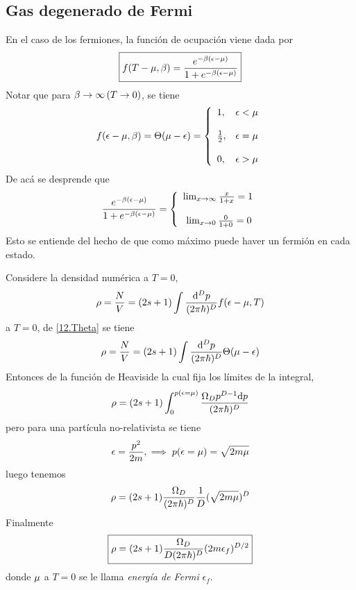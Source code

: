 \subsection{Gas degenerado de Fermi}
En el caso de los fermiones, la función de ocupación viene dada por
\begin{equation}
  \boxed{f(T-\mu,\beta )=\frac{e^{-\beta(\epsilon-\mu  )}}{1+e^{-\beta(\epsilon-\mu)}}}
\end{equation}
Notar que para $\beta\to \infty \,(T\to 0)$, se tiene
\begin{equation}\label{12.Theta}
  f(\epsilon-\mu ,\beta )=\Theta (\mu-\epsilon )= \left\{ \begin{array}{lcc} 1,& \epsilon<\mu \\ \\ 
  \frac{1}{2},&\epsilon=\mu \\ \\  0,&\epsilon>\mu  \end{array}\right.
\end{equation}
De acá se desprende que
\begin{equation}
  \frac{e^{-\beta(\epsilon-\mu  )}}{1+e^{-\beta(\epsilon-\mu)}}= \left\{\begin{array}{lcc}
  	\lim_{x\to\infty}\frac{x}{1+x}=1\\ \\\
  	\lim_{x\to 0}\frac{0}{1+0}=0
  \end{array}   \right.
\end{equation}
Esto se entiende del hecho de que como máximo puede haver un fermión en cada estado.

Considere la densidad numérica a $T=0$,
\begin{equation}
  \rho=\frac{N}{V}=(2s+1)\int \frac{\dd^Dp}{(2\pi \hbar)^D}f(\epsilon-\mu ,T)
\end{equation}
a $T=0$, de \eqref{12.Theta} se tiene
\begin{equation}
  \rho=\frac{N}{V}=(2s+1)\int \frac{\dd^Dp}{(2\pi \hbar)^D} \Theta (\mu-\epsilon)
\end{equation}
Entonces de la función de Heaviside la cual fija los límites de la integral,
\begin{equation}
  \rho =(2s+1)\int_0^{p (\epsilon=\mu )}\frac{\Omega_D p^{D-1}\dd p}{(2\pi\hbar)^D}
\end{equation}
pero para una partícula no-relativista se tiene
\begin{equation}
  \epsilon=\frac{p^2}{2m},\implies  p(\epsilon=\mu )=\sqrt{2m\mu }
\end{equation}
luego tenemos
\begin{equation}
  \rho =(2s+1)\frac{\Omega_D}{(2\pi\hbar)^D}\frac{1}{D}(\sqrt{2m\mu })^D
\end{equation}
Finalmente
\begin{equation}
 \boxed{ \rho=(2s+1)\frac{\Omega_D}{D(2\pi\hbar)^D}(2m\epsilon_f)^{D/2}}
\end{equation}
donde $\mu$ a $T=0$ se le llama \textit{energía de Fermi} $\epsilon_f$.

